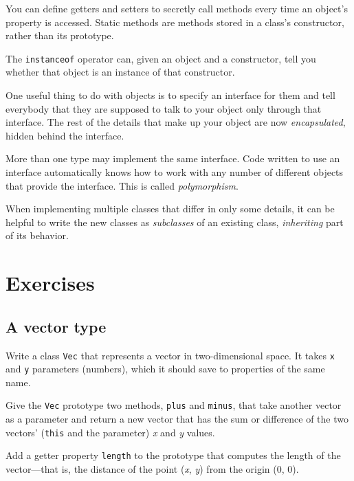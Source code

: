 You can define getters and setters to secretly call methods every time an object's property is accessed. Static methods are methods stored in a class's constructor, rather than its prototype.

The \lstinline`instanceof` operator can, given an object and a constructor, tell you whether that object is an instance of that constructor.

One useful thing to do with objects is to specify an interface for them and tell everybody that they are supposed to talk to your object only through that interface. The rest of the details that make up your object are now \emph{encapsulated}, hidden behind the interface.

More than one type may implement the same interface. Code written to use an interface automatically knows how to work with any number of different objects that provide the interface. This is called \emph{polymorphism}.

When implementing multiple classes that differ in only some details, it can be helpful to write the new classes as \emph{subclasses} of an existing class, \emph{inheriting} part of its behavior.

\section{Exercises}

\label{object.exercise_vector}\subsection{A vector type}

Write a class \lstinline`Vec` that represents a vector in two-dimensional space. It takes \lstinline`x` and \lstinline`y` parameters (numbers), which it should save to properties of the same name.

Give the \lstinline`Vec` prototype two methods, \lstinline`plus` and \lstinline`minus`, that take another vector as a parameter and return a new vector that has the sum or difference of the two vectors' (\lstinline`this` and the parameter) \emph{x} and \emph{y} values.

Add a getter property \lstinline`length` to the prototype that computes the length of the vector—that is, the distance of the point (\emph{x}, \emph{y}) from the origin (0, 0).

